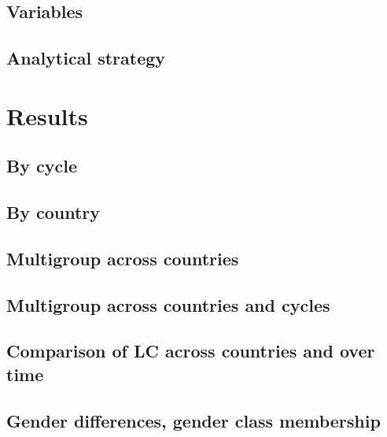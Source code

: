 \documentclass[12pt,twoside]{reedthesis}
\begin{document}
\hypertarget{variables}{%
\section{Variables}\label{variables}}

\hypertarget{analytical-strategy}{%
\section{Analytical strategy}\label{analytical-strategy}}

\clearpage

\hypertarget{results}{%
\chapter{Results}\label{results}}

\hypertarget{by-cycle}{%
\section{By cycle}\label{by-cycle}}

\hypertarget{by-country}{%
\section{By country}\label{by-country}}

\hypertarget{multigroup-across-countries}{%
\section{Multigroup across countries}\label{multigroup-across-countries}}

\hypertarget{multigroup-across-countries-and-cycles}{%
\section{Multigroup across countries and cycles}\label{multigroup-across-countries-and-cycles}}

\hypertarget{comparison-of-lc-across-countries-and-over-time}{%
\section{Comparison of LC across countries and over time}\label{comparison-of-lc-across-countries-and-over-time}}

\hypertarget{gender-differences-gender-class-membership}{%
\section{Gender differences, gender class membership}\label{gender-differences-gender-class-membership}}
\end{document}
